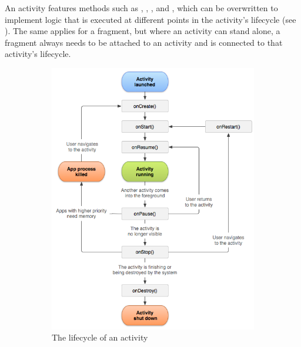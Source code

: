 An activity features methods such as , , , and , which can be overwritten to implement logic that is executed at different points in the activity's lifecycle (see ). The same applies for a fragment, but where an activity can stand alone, a fragment always needs to be attached to an activity and is connected to that activity's lifecycle.

\begin{figure}[H]
  \centering
    \begin{subfigure}[b]{0.6\textwidth}
      \centering
      \includegraphics[width=\linewidth]{images/activity_lifecycle.png}
      \caption[{The lifecycle of an activity \protect{}}]{The lifecycle of an activity}
   \label{fig:activity_lifecycle}
    \end{subfigure}
    \begin{subfigure}[b]{0.3\textwidth}

\end{subfigure}
\end{figure}
